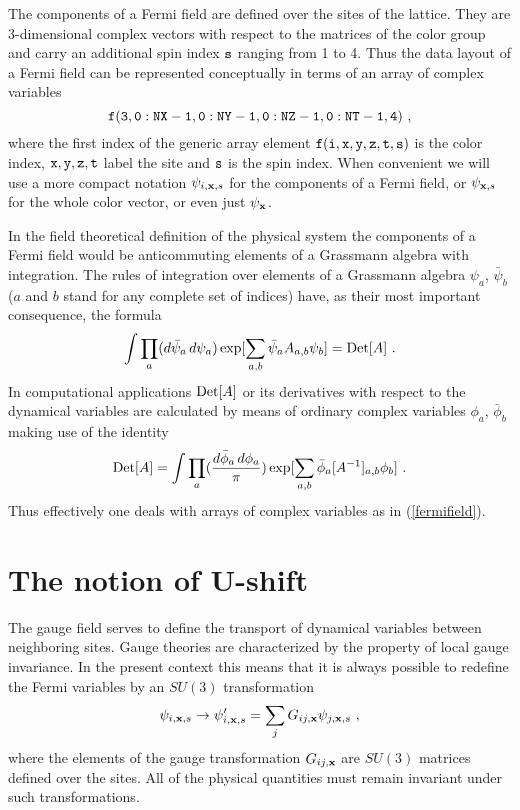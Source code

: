The components of a Fermi field are defined over the sites of the
lattice.  They are 3-dimensional complex vectors with respect to the
matrices of the color group and carry an additional spin index 
$\tt s$ ranging from 1 to 4.  Thus the data layout of a Fermi
field can be represented conceptually in terms of an array
of complex variables
%
\begin{equation}
\tt f(3,0:NX-1,0:NY-1,0:NZ-1,0:NT-1,4) \ ,
\label{fermifield}
\end{equation}
%
where the first index of the generic array element $\tt f(i,x,y,z,t,s)$
is the color index, $\tt x,y,z,t$ label the site and $\tt s$ is the spin index.
When convenient we will use a more compact notation $\psi_{i,{\bf x},s}$
for the components of a Fermi field, or $\psi_{{\bf x},s}$ for
the whole color vector, or even just $\psi_{\bf x}$.
 
In the field theoretical definition of the physical system the components
of a Fermi field would be anticommuting elements of a Grassmann algebra
with integration.  The rules of integration over elements of a Grassmann
algebra $\psi_a$, $\bar\psi_b$ ($a$ and $b$ stand for any complete
set of indices) have, as their most important consequence, the formula
%
\begin{equation}
\int \prod_a (d\bar\psi_a \,d\psi_a) \exp[\sum_{a,b} \bar\psi_a 
A_{a,b} \psi_b] = {\rm Det}[A] \ .
\label{gaussianint}
\end{equation}
%
In computational applications ${\rm Det} [A]$ or its derivatives with
respect to the dynamical variables are calculated by means of ordinary
complex variables $\phi_a$, $\bar\phi_b$ making use of the identity
%
\begin{equation}
{\rm Det}[A] = \int \prod_a ({d\bar\phi_a \,d\phi_a \over \pi})
\exp[\sum_{a,b} \bar\phi_a [A^{-1}]_{a,b} \phi_b]  \ .
\label{gaussiancplx}
\end{equation}
%
Thus effectively one deals with arrays of complex variables as in
(\ref{fermifield}).

\section{The notion of U-shift}
\label{thenotion}

The gauge field serves to define the transport of dynamical variables
between neighboring sites.  Gauge theories are characterized by the
property of local gauge invariance.  In the present context this means
that it is always possible to redefine the Fermi variables by an $SU(3)$
transformation
%
\begin{equation}
\psi_{i,{\bf x},s} \to \psi'_{i,{\bf x},s} =
\sum_j G_{ij,{\bf x}} \psi_{j,{\bf x},s}  \ ,
\label{gaugetrfm}
\end{equation}
%
where the elements of the gauge transformation $G_{ij,{\bf x}}$ are
$SU(3)$ matrices defined over the sites.  All of the physical quantities
must remain invariant under such transformations.

